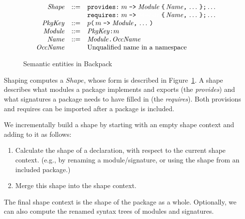 \documentclass{article}
\newcommand{\I}[1]{\ensuremath{\mathit{#1}}}
\begin{document}
\begin{figure}[htpb]
$$
\begin{array}{rcll}
\I{Shape} & ::= & \verb|provides:|\; m \; \verb|->|\; \I{Module}\; \verb|{|\, \I{Name} \verb|,|\, \ldots \, \verb|};| \ldots \\
      &     & \verb|requires:| \; m \; \verb|->|\; \textcolor{white}{\I{Module}}\; \verb|{| \, \I{Name} \verb|,| \, \ldots \, \verb|}| \verb|;| \ldots \\
\I{PkgKey} & ::= & p \verb|(| \, m \; \verb|->| \; \I{Module} \verb|,|\, \ldots\, \verb|)| \\
\I{Module} & ::= & \I{PkgKey} \verb|:| m \\
\I{Name}   & ::= & \I{Module} \verb|.| \I{OccName} \\
\I{OccName} & & \mbox{Unqualified name in a namespace}
\end{array}
$$
\caption{Semantic entities in Backpack} \label{fig:semantic}
\end{figure}

Shaping computes a \I{Shape}, whose form is described in Figure~\ref{fig:semantic}.
A shape describes what modules a package implements and exports (the \emph{provides})
and what signatures a package needs to have filled in (the \emph{requires}).  Both
provisions and requires can be imported after a package is included.

We incrementally build a shape by starting with an empty
shape context and adding to it as follows:

\begin{enumerate}
    \item Calculate the shape of a declaration, with respect to the
        current shape context.  (e.g., by renaming a module/signature,
        or using the shape from an included package.)
    \item Merge this shape into the shape context.
\end{enumerate}

The final shape context is the shape of the package as a whole.
Optionally, we can also compute the renamed syntax trees of
modules and signatures.


\end{document}
